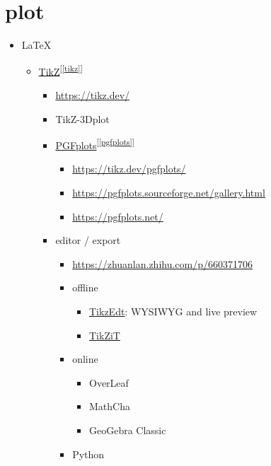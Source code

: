 \documentclass[
]{book}
\providecommand{\tightlist}{%
  \setlength{\itemsep}{0pt}\setlength{\parskip}{0pt}}
\theoremstyle{definition}
\theoremstyle{definition}
\theoremstyle{definition}
\theoremstyle{definition}
\theoremstyle{remark}
\begin{document}
\chapter{plot}\label{plot}

\begin{itemize}
\tightlist
\item
  LaTeX

  \begin{itemize}
  \tightlist
  \item
    \hyperref[tikz]{TikZ}\textsuperscript{{[}\ref{tikz}{]}}

    \begin{itemize}
    \tightlist
    \item
      \url{https://tikz.dev/}
    \item
      TikZ-3Dplot
    \item
      \hyperref[pgfplots]{PGFplots}\textsuperscript{{[}\ref{pgfplots}{]}}

      \begin{itemize}
      \tightlist
      \item
        \url{https://tikz.dev/pgfplots/}
      \item
        \url{https://pgfplots.sourceforge.net/gallery.html}
      \item
        \url{https://pgfplots.net/}
      \end{itemize}
    \item
      editor / export

      \begin{itemize}
      \tightlist
      \item
        \url{https://zhuanlan.zhihu.com/p/660371706}
      \item
        offline

        \begin{itemize}
        \tightlist
        \item
          \href{http://www.tikzedt.org/}{TikzEdt}: WYSIWYG and live preview
        \item
          \href{https://tikzit.github.io/}{TikZiT}
        \end{itemize}
      \item
        online

        \begin{itemize}
        \tightlist
        \item
          OverLeaf
        \item
          MathCha
        \item
          GeoGebra Classic
        \end{itemize}
      \item
        Python


\end{itemize}
\end{itemize}
\end{itemize}
\end{itemize}
\end{document}
